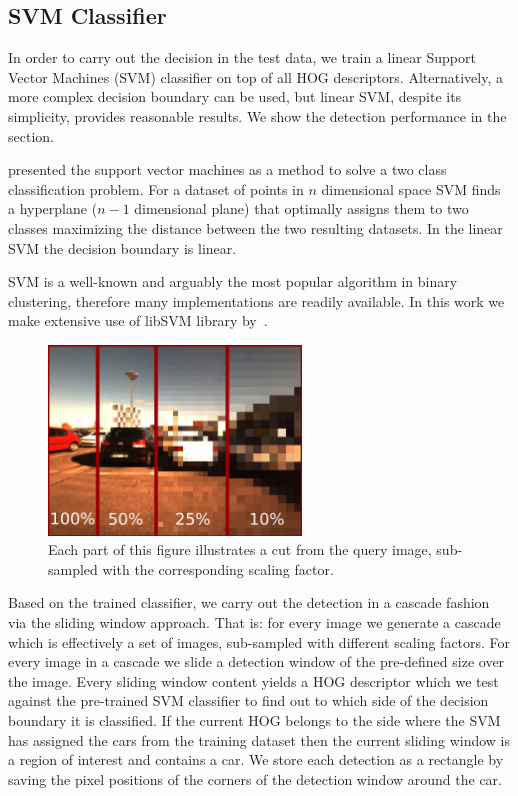 
\subsection{SVM Classifier}\label{sub:svm_classifier}

In order to carry out the decision in the test data, we train a linear Support
Vector Machines (SVM) classifier on top of all HOG descriptors. Alternatively,
a more complex decision boundary can be used, but linear SVM, despite its
simplicity, provides reasonable results. We show the detection performance in
the  section.

\citet{svm} presented the support vector machines as a method to solve a two
class classification problem. For a dataset of points in $n$ dimensional space
SVM finds a hyperplane ($n-1$ dimensional plane) that optimally assigns them
to two classes maximizing the distance between the two resulting datasets. In
the linear SVM the decision boundary is linear.

SVM is a well-known and arguably the most popular algorithm in binary
clustering, therefore many implementations are readily available. In this work
we make extensive use of libSVM library by~\citet{libSVM2011}.

\begin{figure}[t]
    \begin{center}
        \includegraphics[width=0.6\textwidth]{pictures/cascades.png}
    \end{center}
    \caption{Each part of this figure illustrates a cut from the query image, sub-sampled with the corresponding scaling factor.}
    \label{fig:cascades}
\end{figure}

Based on the trained classifier, we carry out the detection in a cascade
fashion via the sliding window approach. That is: for every image we generate
a cascade which is effectively a set of images, sub-sampled with different
scaling factors. For every image in a cascade we slide a detection window of
the pre-defined size over the image. Every sliding window content yields a HOG
descriptor which we test against the pre-trained SVM classifier to find out to
which side of the decision boundary it is classified. If the current HOG
belongs to the side where the SVM has assigned the cars from the training
dataset then the current sliding window is a region of interest and contains a
car. We store each detection as a rectangle by saving the pixel positions of
the corners of the detection window around the car.

